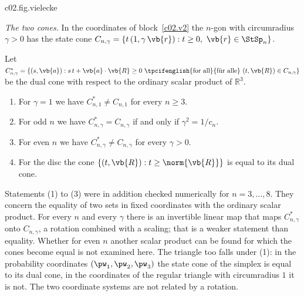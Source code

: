 \begin{vertiefung}
  \begin{tpcfigure}{c02.fig.vielecke}
    \caption{The same pair of points $x_1 = (1,0)$, $x_2 = (-\tfrac34, \tfrac14)$ in three
      state spaces, each with the level lines of an optimal extreme effect. (a) In the
      square $\StSp_4$ the point $x_2$ lies on the edge on which the effect has the value
      $0$; the distinction succeeds with certainty. (b) In the pentagon $x_2$ lies in the
      interior, just beside the edge with $f = 0$. (c) In the disc the line $f = 0$
      touches the boundary in a single point, and $x_2$ lies clearly beside it. The optima
      are in \eqref{c02.eq.gleiches-paar}.}
  \end{tpcfigure}

  \emph{The two cones.} In the coordinates of block~\ref{c02.v2} the $n$-gon with
  circumradius $\gamma > 0$ has the state cone
  $C_{n,\gamma} = \{ t\,(1, \gamma\,\vb{r}) : t \geq 0,\ \vb{r} \in \StSp_n \}$.

  \begin{proposition}\label{c02.prop.selbstdual}
    Let $C_{n,\gamma}^{*} = \{ (s, \vb{a}) : s\,t + \vb{a}\cdot\vb{R} \geq 0
    \ \text{\tpcifenglish{for all}{für alle}}\ (t, \vb{R}) \in C_{n,\gamma} \}$ be the dual
    cone with respect to the ordinary scalar product of $\mathbb{R}^3$.
    \begin{enumerate}
      \item For $\gamma = 1$ we have $C_{n,1}^{*} \neq C_{n,1}$ for every $n \geq 3$.
      \item For odd $n$ we have $C_{n,\gamma}^{*} = C_{n,\gamma}$ if and only if
        $\gamma^2 = 1/c_n$.
      \item For even $n$ we have $C_{n,\gamma}^{*} \neq C_{n,\gamma}$ for every
        $\gamma > 0$.
      \item For the disc the cone $\{ (t, \vb{R}) : t \geq \norm{\vb{R}} \}$ is equal to
        its dual cone.
    \end{enumerate}
  \end{proposition}

  Statements (1) to (3) were in addition checked numerically for $n = 3, \dots, 8$. They
  concern the equality of two sets in fixed coordinates with the ordinary scalar product.
  For every $n$ and every $\gamma$ there is an invertible linear map that maps
  $C_{n,\gamma}^{*}$ onto $C_{n,\gamma}$, a rotation combined with a scaling; that is a
  weaker statement than equality. Whether for even $n$ another scalar product can be found
  for which the cones become equal is not examined here. The triangle too falls under (1):
  in the probability coordinates $(\pw_1, \pw_2, \pw_3)$ the state cone of the simplex is
  equal to its dual cone, in the coordinates of the regular triangle with circumradius $1$
  it is not. The two coordinate systems are not related by a rotation.
\end{vertiefung}

